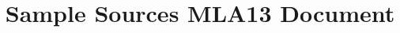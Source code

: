 \documentclass{article}
\title{Sample Sources MLA13 Document}
\begin{document}
\makeheader
\nocite{*}
\makeworkscited
\end{document}
